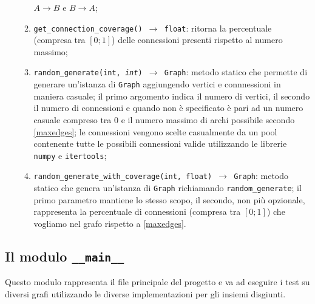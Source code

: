 \begin{enumerate}
\begin{enumerate}[resume]
                        $A \rightarrow B$ e $B \rightarrow A$;
                  \item \texttt{get\_connection\_coverage() $\rightarrow$ float}: ritorna la percentuale (compresa tra $[0;1]$) delle connessioni
                        presenti rispetto al numero massimo;
                  \item \texttt{random\_generate(int, \textit{int}) $\rightarrow$ Graph}: metodo statico che permette di generare un'istanza
                        di \texttt{Graph} aggiungendo vertici e connnessioni in maniera casuale; il primo argomento indica il numero di vertici, il secondo
                        il numero di connessioni e quando non è specificato è pari ad un numero casuale compreso tra 0 e il numero massimo di
                        archi possibile secondo \eqref{maxedges}; le connessioni vengono scelte casualmente da un pool contenente tutte le possibili
                        connessioni valide utilizzando le librerie \texttt{numpy} e \texttt{itertools};
                  \item \texttt{random\_generate\_with\_coverage(int, float) $\rightarrow$ Graph}: metodo statico che genera un'istanza
                        di \texttt{Graph} richiamando \texttt{random\_generate}; il primo parametro mantiene lo stesso scopo, il secondo, non più
                        opzionale, rappresenta la percentuale di connessioni (compresa tra $[0;1]$) che vogliamo nel grafo rispetto a \eqref{maxedges}.
            \end{enumerate}
\end{enumerate}

\subsection{Il modulo \texttt{\_\_main\_\_}}
Questo modulo rappresenta il file principale del progetto e va ad eseguire i test su diversi grafi utilizzando
le diverse implementazioni per gli insiemi disgiunti.\newline


